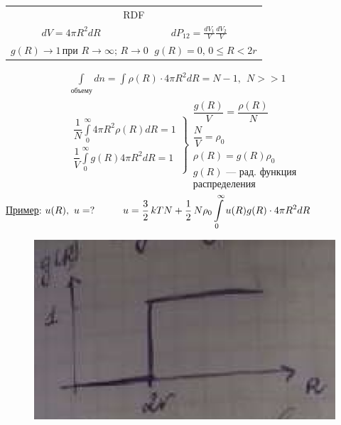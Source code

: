 \begin{lecture}
\begin{lecSection}[Введение]
	\begin{center}\begin{tabular}{cc}
		\multicolumn{2}{c}{RDF} \\
		$ dV = 4 \pi R^2 dR $ & $ d P_{12} = \frac{dV_1}{V} \frac{dV_2}{V} $ \\
		\multicolumn{2}{c}{$ g (R) \rightarrow 1\, \text{при } R \rightarrow \infty;\, R \rightarrow 0\,~~ g(R) = 0, \, 0 \leq R < 2r $} \\
	\end{tabular}\end{center}
	\begin{gather*}
	\int\limits_\text{объему} dn = \int \rho ( R ) \cdot 4 \pi R ^ { 2 } d R = N - 1, ~~ N >> 1 \\
	\left.\begin{array}{c}
	\dfrac{1}{N} \displaystyle \int\limits_0^\infty 4 \pi R^2 \rho (R) dR = 1 \\
	\dfrac { 1 } { V } \displaystyle \int\limits_0^\infty g ( R ) 4 \pi R ^ { 2 } d R = 1
	\end{array} \right \}
	\begin{array}{c}
		\dfrac{g (R)}{V} = \dfrac{\rho (R)}{N} \\
		\dfrac{N}{V} = \rho_0 \\
		\boxed{ \rho(R) = g(R) \rho_0 } \\
		g(R) \text{ --- рад. функция} \\ \text{распределения}
	\end{array}
	\end{gather*}
	\underline{Пример}: $ u(R),~ u=? \hspace*{1cm} u = \dfrac{3}{2}\, kTN + \dfrac{1}{2}\, N \rho_0 \displaystyle \int\limits_0^\infty u(R) g(R) \cdot 4\pi R^2 dR $
		\begin{figure}[h]
		\begin{minipage}{0.28\linewidth}
			\centering\includegraphics[width=\linewidth]{lecture_12/id_gas1}

\end{minipage}
\end{figure}
\end{lecSection}
\end{lecture}
